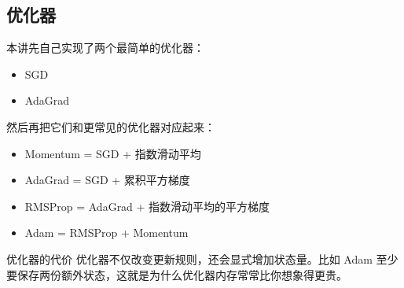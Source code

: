 \subsection{优化器}

本讲先自己实现了两个最简单的优化器：
\begin{itemize}
    \item SGD
    \item AdaGrad
\end{itemize}

然后再把它们和更常见的优化器对应起来：
\begin{itemize}
    \item Momentum = SGD + 指数滑动平均
    \item AdaGrad = SGD + 累积平方梯度
    \item RMSProp = AdaGrad + 指数滑动平均的平方梯度
    \item Adam = RMSProp + Momentum
\end{itemize}

\begin{knowledgebox}{优化器的代价}
优化器不仅改变更新规则，还会显式增加状态量。比如 Adam 至少要保存两份额外状态，这就是为什么优化器内存常常比你想象得更贵。
\end{knowledgebox}

